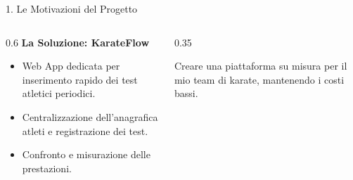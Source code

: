 \documentclass[aspectratio=169, 10pt]{beamer}
\begin{document}
\begin{frame}{1. Le Motivazioni del Progetto}
  \begin{columns}
    \begin{column}{0.6\textwidth}
      \textbf{La Soluzione: KarateFlow}
      \begin{itemize}
        \item Web App dedicata per inserimento rapido dei test atletici periodici.
        \item Centralizzazione dell'anagrafica atleti e registrazione dei test.
        \item Confronto e misurazione delle prestazioni.
      \end{itemize}
    \end{column}
    \begin{column}{0.35\textwidth}
      \begin{tcolorbox}[colback=karateRed!10, colframe=karateRed, title=Obiettivo Primario]
        Creare una piattaforma su misura per il mio team di karate, mantenendo i costi bassi.
      \end{tcolorbox}
    \end{column}
  \end{columns}
\end{frame}
\end{document}
